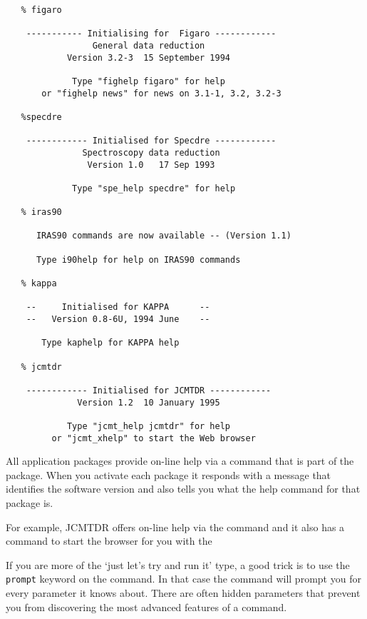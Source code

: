 \begin{verbatim}
   % figaro

    ----------- Initialising for  Figaro ------------
                 General data reduction
            Version 3.2-3  15 September 1994
 
             Type "fighelp figaro" for help
       or "fighelp news" for news on 3.1-1, 3.2, 3.2-3

   %specdre
 
    ------------ Initialised for Specdre ------------
               Spectroscopy data reduction
                Version 1.0   17 Sep 1993
 
             Type "spe_help specdre" for help
 
   % iras90

      IRAS90 commands are now available -- (Version 1.1)
 
      Type i90help for help on IRAS90 commands
 
   % kappa
 
    --     Initialised for KAPPA      -- 
    --   Version 0.8-6U, 1994 June    -- 
 
       Type kaphelp for KAPPA help   
 
   % jcmtdr
 
    ------------ Initialised for JCMTDR ------------
              Version 1.2  10 January 1995
 
            Type "jcmt_help jcmtdr" for help
         or "jcmt_xhelp" to start the Web browser
\end{verbatim}

   All application packages provide on-line help via a command that is
   part of the package. When you activate each package
   it responds with a message that identifies the software version and
   also tells you what the help command for that package is.

   For example, JCMTDR offers on-line help via the command
{\tt {}}
   and it also has a command
{\tt {}}
   to start the
   browser for you with the

   If you are more of the `just let's try and run it' type, a good trick
   is to use the {\tt prompt} keyword on the command. In that case
   the command will prompt you for every parameter it knows about. There
   are often hidden parameters that prevent you from discovering the
   most advanced features of a command.

